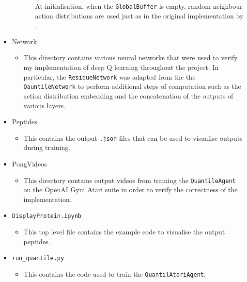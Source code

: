 \begin{itemize}
\begin{itemize}
\begin{itemize}
            At initialisation, when the \texttt{GlobalBuffer} is empty, random 
            neighbour action distributions are used just as in the original
            implementation by \cite{Yang2018}.
        \end{itemize}
    \end{itemize}
    \item Network
    \begin{itemize}
        \item This directory contains various neural networks that were
        used to verify my implementation of deep Q learning throughout the
        project. In particular, the \texttt{ResidueNetwork} was adapted
        from the the \texttt{QauntileNetwork} to perform additional
        steps of computation such as the action distribution embedding
        and the concatenation of the outputs of various layers. 
    \end{itemize}
    \item Peptides
    \begin{itemize}
        \item This contains the output \texttt{.json} files that can be 
        used to visualise outputs during training.
    \end{itemize}
    \item PongVideos 
    \begin{itemize}
        \item This directory contains output videos from training
        the \texttt{QuantileAgent} on the OpenAI Gym
        Atari suite in order to verify the correctness of the implementation.
    \end{itemize}
    \item \texttt{DisplayProtein.ipynb}
    \begin{itemize}
        \item This top level file contains the example code to visualise
        the output peptides.
    \end{itemize}
    \item \texttt{run\_quantile.py}
    \begin{itemize}
        \item This contains the code used to train the \texttt{QuantilAtariAgent}.
    \end{itemize}
\end{itemize}

